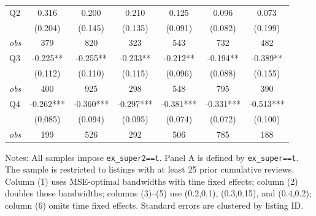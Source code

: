 \begin{table}[!htbp]
\begin{tabular}{lcccccc}
Q2 & 0.316 & 0.200 & 0.210 & 0.125 & 0.096 & 0.073 \\
 & (0.204) & (0.145) & (0.135) & (0.091) & (0.082) & (0.199) \\
\textit{obs} & 379 & 820 & 323 & 543 & 732 & 482 \\
Q3 & -0.225** & -0.255** & -0.233** & -0.212** & -0.194** & -0.389** \\
 & (0.112) & (0.110) & (0.115) & (0.096) & (0.088) & (0.155) \\
\textit{obs} & 400 & 925 & 298 & 548 & 795 & 390 \\
Q4 & -0.262*** & -0.360*** & -0.297*** & -0.381*** & -0.331*** & -0.513*** \\
 & (0.085) & (0.094) & (0.095) & (0.074) & (0.072) & (0.100) \\
\textit{obs} & 199 & 526 & 292 & 506 & 785 & 188 \\
\bottomrule
\end{tabular}
\begin{minipage}{0.98\textwidth}\footnotesize
Notes: All samples impose \texttt{ex\_super2==t}. Panel A is defined by \texttt{ex\_super==t}. The sample is restricted to listings with at least 25 prior cumulative reviews. Column (1) uses MSE-optimal bandwidths with time fixed effects; column (2) doubles those bandwidths; columns (3)--(5) use (0.2,0.1), (0.3,0.15), and (0.4,0.2); column (6) omits time fixed effects. Standard errors are clustered by listing ID.
\end{minipage}
\end{table}

